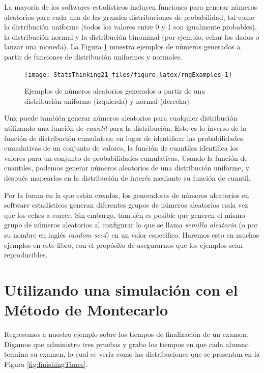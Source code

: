 \documentclass[
  12pt,
]{book}
\begin{document}
La mayoría de los softwares estadísticos incluyen funciones para generar números aleatorios para cada una de las grandes distribuciones de probabilidad, tal como la distribución uniforme (todos los valores entre 0 y 1 son igualmente probables), la distribución normal y la distribución binominal (por ejemplo, echar los dados o lanzar una moneda). La Figura \ref{fig:rngExamples} muestra ejemplos de números generados a partir de funciones de distribución uniformes y normales.

\begin{figure}
\texttt{[image: StatsThinking21\_files/figure-latex/rngExamples-1]} \caption{Ejemplos de números aleatorios generados a partir de una distribución uniforme (izquierda) y normal (derecha).}\label{fig:rngExamples}
\end{figure}

Unx puede también generar números aleatorios para cualquier distribución utilizando una función de \emph{cuantil} para la distribución. Esto es lo inverso de la función de distribución cumulativa; en lugar de identificar las probabilidades cumulativas de un conjunto de valores, la función de cuantiles identifica los valores para un conjunto de probabilidades cumulativas. Usando la función de cuantiles, podemos generar números aleatorios de una distribución uniforme, y después mapearlos en la distribución de interés mediante su función de cuantil.

Por la forma en la que están creados, los generadores de números aleatorios en software estadísticos generan diferentes grupos de números aleatorios cada vez que los eches a correr. Sin embargo, también es posible que generen el mismo grupo de números aleatorios al configurar lo que se llama \emph{semilla aleatoria} (o por su nombre en inglés \emph{random seed}) en un valor específico. Haremos esto en muchos ejemplos en este libro, con el propósito de asegurarnos que los ejemplos sean reproducibles.

\hypertarget{utilizando-una-simulaciuxf3n-con-el-muxe9todo-de-montecarlo}{%
\section{Utilizando una simulación con el Método de Montecarlo}\label{utilizando-una-simulaciuxf3n-con-el-muxe9todo-de-montecarlo}}

Regresemos a nuestro ejemplo sobre los tiempos de finalización de un examen. Digamos que administro tres pruebas y grabo los tiempos en que cada alumno termina su examen, lo cual se vería como las distribuciones que se presentan en la Figura \ref{fig:finishingTimes}.
\end{document}
